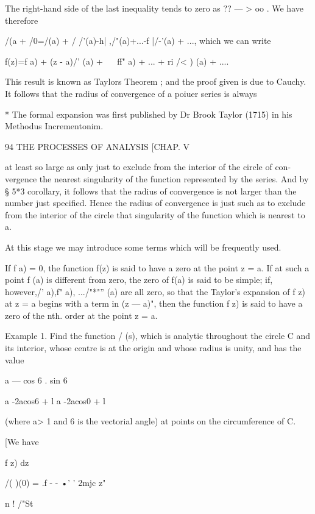 {{The right-hand side of the last inequality tends to zero as ?? — > oo . We 
have therefore 

/(a + /0=/(a) + / /'(a)-h| ,/"(a)+...-f |/-'(a) + ..., 
which we can write 

f(z)=f a) + (z - a)/' (a) +  ~ ~ff" a) + ... + ri /< ) (a) + .... 

This result is known as Taylors Theorem ; and the proof given is due to 
Cauchy. It follows that the radius of convergence of a poiuer series is always 

* The formal expansion was first published by Dr Brook Taylor (1715) in his Methodus 
Incrementonim. 



94 THE PROCESSES OF ANALYSIS [CHAP. V 

at least so large as only just to exclude from the interior of the circle of con- 
vergence the nearest singularity of the function represented by the series. And 
by § 5*3 corollary, it follows that the radius of convergence is not larger 
than the number just specified. Hence the radius of convergence is just such 
as to exclude from the interior of the circle that singularity of the function 
which is nearest to a. 

At this stage we may introduce some terms which will be frequently 
used. 

If f a) = 0, the function f(z) is said to have a zero at the point z = a. 
If at such a point f (a) is different from zero, the zero of f(a) is said to be 
simple; if, however,/'  a),f" a), .../"*"'' (a) are all zero, so that the Taylor's 
expansion of f z) at z = a begins with a term in (z — a)", then the function 
f z) is said to have a zero of the nth. order at the point z = a. 

Example 1. Find the function / (s), which is analytic throughout the circle C and its 
interior, whose centre is at the origin and whose radius is unity, and has the value 

a — cos 6 . sin 6 



a -2acos6 + l a -2acos0 + l 

(where a> 1 and 6 is the vectorial angle) at points on the circumference of C. 

[We have 

f z) dz 



/( )(0) =  .f - -  
•'   ' 2mjc z"  

n ! /"St 

}}

